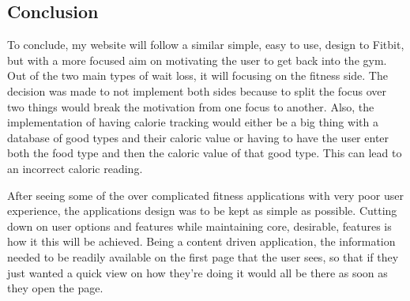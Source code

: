 \subsection{Conclusion}
To conclude, my website will follow a similar simple, easy to use, design to Fitbit, but with a more focused aim on motivating the user to get back into the gym. Out of the two main types of wait loss, it will focusing on the fitness side. The decision was made to not implement both sides because to split the focus over two things would break the motivation from one focus to another. Also, the implementation of having calorie tracking would either be a big thing with a database of good types and their caloric value or having to have the user enter both the food type and then the caloric value of that good type. This can lead to an incorrect caloric reading.

After seeing some of the over complicated fitness applications with very poor user experience, the applications design was to be kept as simple as possible. Cutting down on user options and features while maintaining core, desirable, features is how it this will be achieved. Being a content driven application, the information needed to be readily available on the first page that the user sees, so that if they just wanted a quick view on how they're doing it would all be there as soon as they open the page.
